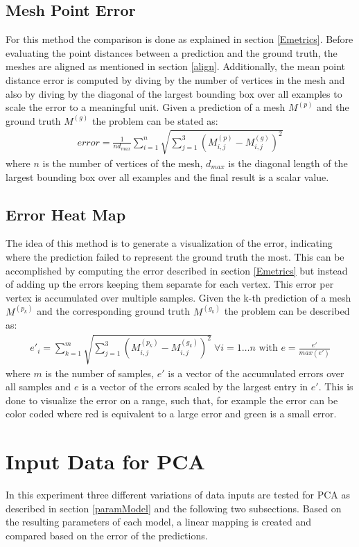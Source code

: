 \subsection{Mesh Point Error} %
\label{mpError}
For this method the comparison is done as explained in section \ref{Emetrics}. Before evaluating the point distances between a prediction and the ground truth, the meshes are aligned as mentioned in section \ref{align}. Additionally, the mean point distance error is computed by diving by the number of vertices in the mesh and also by diving by the diagonal of the largest bounding box over all examples to scale the error to a meaningful unit. Given a prediction of a mesh $M^{(p)}$ and the ground truth $M^{(g)}$ the problem can be stated as:
\begin{gather}
error = \frac{1}{nd_{max}}\sum_{i=1}^{n} \sqrt{\sum_{j=1}^3(M_{i,j}^{(p)} - M_{i,j}^{(g)})^2}
\end{gather}
where $n$ is the number of vertices of the mesh, $d_{max}$ is the diagonal length of the largest bounding box over all examples and the final result is a scalar value.
\subsection{Error Heat Map} %
\label{mhError}
The idea of this method is to generate a visualization of the error, indicating where the prediction failed to represent the ground truth the most. This can be accomplished by computing the error described in section \ref{Emetrics} but instead of adding up the errors keeping them separate for each vertex. This error per vertex is accumulated over multiple samples. Given the  k-th prediction of a mesh $M^{(p_k)}$ and the corresponding ground truth $M^{(g_k)}$ the problem can be described as:
\begin{gather}
e'_{i} = \sum_{k=1}^{m} \sqrt{\sum_{j=1}^3(M_{i,j}^{(p_k)} - M_{i,j}^{(g_k)})^2} \  \forall i=1 \dots n \text{ with } e = \frac{e'}{max(e')}
\end{gather}
where $m$ is the number of samples, $e'$ is a vector of the accumulated errors over all samples and $e$ is a vector of the errors scaled by the largest entry in $e'$. This is done to visualize the error on a range, such that, for example the error can be color coded where red is equivalent to a large error and green is a small error.
\section{Input Data for PCA}
In this experiment three different variations of data inputs are tested for PCA as described in section \ref{paramModel} and the following two subsections. Based on the resulting parameters of each model, a linear mapping is created and compared based on the error of the predictions.

